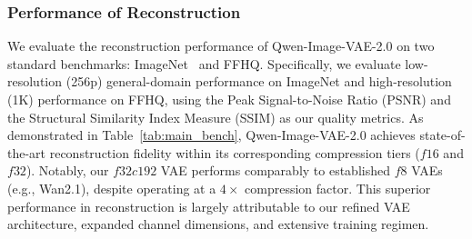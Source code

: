 \documentclass{llmxive}
\begin{document}
\subsubsection{Performance of Reconstruction}
We evaluate the reconstruction performance of Qwen-Image-VAE-2.0 on two standard benchmarks: ImageNet~\citep{deng2009imagenet} and FFHQ\citep{Karras2018ASG}. Specifically, we evaluate low-resolution (256p) general-domain performance on ImageNet and high-resolution (1K) performance on FFHQ, using the Peak Signal-to-Noise Ratio (PSNR) and the Structural Similarity Index Measure (SSIM) as our quality metrics. As demonstrated in Table~\ref{tab:main_bench}, Qwen-Image-VAE-2.0 achieves state-of-the-art reconstruction fidelity within its corresponding compression tiers ($f16$ and $f32$). Notably, our $f32c192$ VAE performs comparably to established $f8$ VAEs (e.g., Wan2.1), despite operating at a $4\times$ compression factor. This superior performance in reconstruction is largely attributable to our refined VAE architecture, expanded channel dimensions, and extensive training regimen. 
\end{document}
